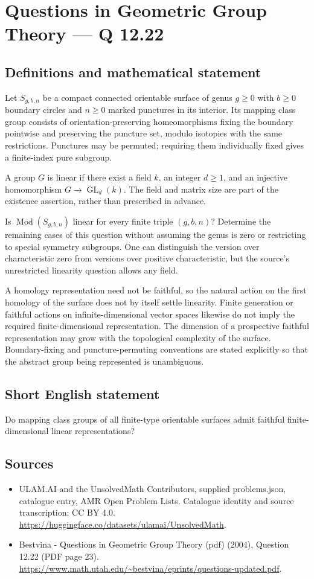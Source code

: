\documentclass[11pt,a4paper]{article}
\begin{document}
\section*{Questions in Geometric Group Theory — Q 12.22}\label{statement}

\subsection{Definitions and mathematical statement}
Let $S_{g,b,n}$ be a compact connected orientable surface of genus $g\geq0$ with $b\geq0$ boundary circles and $n\geq0$ marked punctures in its interior. Its mapping class group consists of orientation-preserving homeomorphisms fixing the boundary pointwise and preserving the puncture set, modulo isotopies with the same restrictions. Punctures may be permuted; requiring them individually fixed gives a finite-index pure subgroup.

A group $G$ is linear if there exist a field $k$, an integer $d\geq1$, and an injective homomorphism $G\to\operatorname{GL}_d(k)$. The field and matrix size are part of the existence assertion, rather than prescribed in advance.

Is $\operatorname{Mod}(S_{g,b,n})$ linear for every finite triple $(g,b,n)$? Determine the remaining cases of this question without assuming the genus is zero or restricting to special symmetry subgroups. One can distinguish the version over characteristic zero from versions over positive characteristic, but the source's unrestricted linearity question allows any field.

A homology representation need not be faithful, so the natural action on the first homology of the surface does not by itself settle linearity. Finite generation or faithful actions on infinite-dimensional vector spaces likewise do not imply the required finite-dimensional representation. The dimension of a prospective faithful representation may grow with the topological complexity of the surface. Boundary-fixing and puncture-permuting conventions are stated explicitly so that the abstract group being represented is unambiguous.
\subsection{Short English statement}
Do mapping class groups of all finite-type orientable surfaces admit faithful finite-dimensional linear representations?
\subsection{Sources}
\begin{itemize}
\item[S1] ULAM.AI and the UnsolvedMath Contributors, supplied problems.json, catalogue entry, AMR Open Problem Lists. Catalogue identity and source transcription; CC BY 4.0.
\url{https://huggingface.co/datasets/ulamai/UnsolvedMath}.
\item[S2] Bestvina - Questions in Geometric Group Theory (pdf) (2004), Question 12.22 (PDF page 23). 
\url{https://www.math.utah.edu/~bestvina/eprints/questions-updated.pdf}.
\end{itemize}
\end{document}
